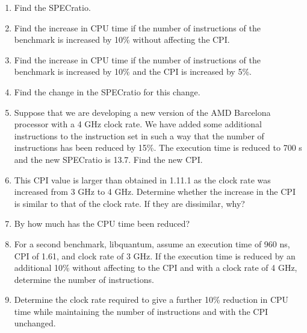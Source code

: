 \documentclass[10pt]{article}
\begin{document}
\begin{enumerate}
\begin{enumerate}
        \item
        Find the SPECratio.
        
        \item
        Find the increase in CPU time if the number of instructions of the benchmark is increased by 10\% without affecting the CPI.
        
        \item
        Find the increase in CPU time if the number of instructions of the benchmark is increased by 10\% and the CPI is increased by 5\%.
        
        \item
        Find the change in the SPECratio for this change.
        
        \item
        Suppose that we are developing a new version of the AMD Barcelona processor with a 4 GHz clock rate. We have added some additional instructions to the instruction set in such a way that the number of instructions has been reduced by 15\%. The execution time is reduced to 700 s and the new SPECratio is 13.7. Find the new CPI.
        
        \item
        This CPI value is larger than obtained in 1.11.1 as the clock rate was increased from 3 GHz to 4 GHz. Determine whether the increase in the CPI is similar to that of the clock rate. If they are dissimilar, why?
        
        \item
        By how much has the CPU time been reduced?
        
        \item
        For a second benchmark, libquantum, assume an execution time of 960 ns, CPI of 1.61, and clock rate of 3 GHz. If the execution time is reduced by an additional 10\% without affecting to the CPI and with a clock rate of 4 GHz, determine the number of instructions.
        
        \item
        Determine the clock rate required to give a further 10\% reduction in CPU time while maintaining the number of instructions and with the CPI unchanged.
        

\end{enumerate}
\end{enumerate}
\end{document}
